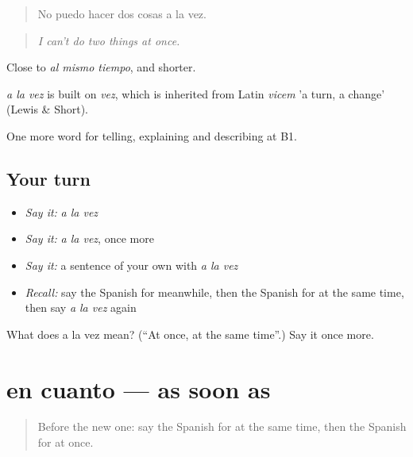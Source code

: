 \begin{quote}
No puedo hacer dos cosas a la vez.
\end{quote}

\begin{quote}
\emph{I can't do two things at once.}
\end{quote}

Close to \emph{al mismo tiempo}, and shorter.

\begin{cousinweb}
\emph{a la vez} is built on \emph{vez}, which is inherited from Latin \emph{vicem} 'a turn, a change' (Lewis \& Short).
\end{cousinweb}

\begin{grammarlens}[title={What you've built}]
One more word for telling, explaining and describing at B1.
\end{grammarlens}

\subsection*{Your turn}
\begin{itemize}
\raggedright
  \item \emph{Say it:} \emph{a la vez}
  \item \emph{Say it:} \emph{a la vez}, once more
  \item \emph{Say it:} a sentence of your own with \emph{a la vez}
  \item \emph{Recall:} say the Spanish for meanwhile, then the Spanish for at the same time, then say \emph{a la vez} again
\end{itemize}

\begin{tcolorbox}[breakable,colback=teal!4,colframe=teal!35!black,title={Before you move on}]
What does a la vez mean? (\textquotedblleft{}At once, at the same time\textquotedblright{}.) Say it once more.
\end{tcolorbox}
\section[en cuanto]{en cuanto — as soon as}

\label{lesson:ES-C536-en-cuanto}



\begin{quote}
Before the new one: say the Spanish for at the same time, then the Spanish for at once.
\end{quote}

